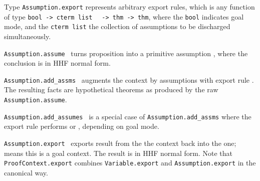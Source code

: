 \begin{isabellebody}
\begin{isamarkuptext}
  \begin{description}

  \item Type \verb|Assumption.export| represents arbitrary export
  rules, which is any function of type \verb|bool -> cterm list|\isasep\isanewline%
\verb|  -> thm -> thm|, where the \verb|bool| indicates goal mode,
  and the \verb|cterm list| the collection of assumptions to be
  discharged simultaneously.

  \item \verb|Assumption.assume|~ turns proposition  into a primitive assumption , where the
  conclusion  is in HHF normal form.

  \item \verb|Assumption.add_assms|~ augments the context
  by assumptions  with export rule .  The
  resulting facts are hypothetical theorems as produced by the raw
  \verb|Assumption.assume|.

  \item \verb|Assumption.add_assumes|~ is a special case of
  \verb|Assumption.add_assms| where the export rule performs  or , depending on goal
  mode.

  \item \verb|Assumption.export|~
  exports result  from the the  context
  back into the  one;  means
  this is a goal context.  The result is in HHF normal form.  Note
  that \verb|ProofContext.export| combines \verb|Variable.export|
  and \verb|Assumption.export| in the canonical way.


\end{description}
\end{isamarkuptext}
\end{isabellebody}
